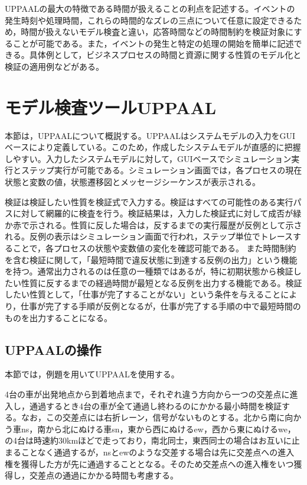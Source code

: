 \documentclass{tpu-sotu}
\begin{document}
	UPPAALの最大の特徴である時間が扱えることの利点を記述する。イベントの発生時刻や処理時間，これらの時間的なズレの三点について任意に設定できるため，時間が扱えないモデル検査と違い，応答時間などの時間制約を検証対象にすることが可能である。また，イベントの発生と特定の処理の開始を簡単に記述できる。具体例として，ビジネスプロセスの時間と資源に関する性質のモデル化と検証の適用例などがある\cite{a9}。
	\section{モデル検査ツールUPPAAL}
	本節は，UPPAALについて概説する。UPPAALはシステムモデルの入力をGUIベースにより定義している。このため，作成したシステムモデルが直感的に把握しやすい。入力したシステムモデルに対して，GUIベースでシミュレーション実行とステップ実行が可能である。シミュレーション画面では，各プロセスの現在状態と変数の値，状態遷移図とメッセージシーケンスが表示される。
	
	検証は検証したい性質を検証式で入力する。検証はすべての可能性のある実行パスに対して網羅的に検査を行う。検証結果は，入力した検証式に対して成否が緑か赤で示される。性質に反した場合は，反するまでの実行履歴が反例として示される。反例の表示はシミュレーション画面で行われ，ステップ単位でトレースすることで，各プロセスの状態や変数値の変化を確認可能である。
	また時間制約を含む検証に関して，「最短時間で違反状態に到達する反例の出力」という機能を持つ。通常出力されるのは任意の一種類ではあるが，特に初期状態から検証したい性質に反するまでの経過時間が最短となる反例を出力する機能である。検証したい性質として，「仕事が完了することがない」という条件を与えることにより，仕事が完了する手順が反例となるが，仕事が完了する手順の中で最短時間のものを出力することになる。
	\subsection{UPPAALの操作}
	本節では，例題を用いてUPPAALを使用する。
	
	4台の車が出発地点から到着地点まで，それぞれ違う方向から一つの交差点に進入し，通過するとき4台の車が全て通過し終わるのにかかる最小時間を検証する。なお，この交差点には右折レーン，信号がないものとする。北から南に向かう車ns，南から北にぬける車sn，東から西にぬけるew，西から東にぬけるwe，の4台は時速約30kmほどで走っており，南北同士，東西同士の場合はお互いに止まることなく通過するが，nsとewのような交差する場合は先に交差点への進入権を獲得した方が先に通過することとなる。そのため交差点への進入権をいつ獲得し，交差点の通過にかかる時間も考慮する。
	
\end{document}
